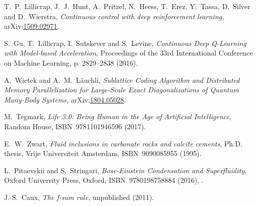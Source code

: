 \documentclass[11pt, a4paper]{report} %
\begin{document}
\begin{thebibliography}{99}
T.~P.~Lillicrap, J.~J.~Hunt, A.~Pritzel, N.~Heess, T.~Erez, Y.~Tassa, D.~Silver and D.~Wierstra, \textit{Continuous control with deep reinforcement learning}, arXiv:\href{https://arxiv.org/abs/1509.02971}{1509.02971}.




S.~Gu, T.~Lillicrap, I.~Sutskever and S.~Levine, \textit{Continuous Deep Q-Learning with Model-based Acceleration}, Proceedings of the 33rd International Conference on Machine Learning, p. 2829--2838 (2016). 



A.~Wietek and A.~M.~Läuchli, \textit{Sublattice Coding Algorithm and Distributed Memory Parallelization for Large-Scale Exact Diagonalizations of Quantum Many-Body Systems}, arXiv:\href{https://arxiv.org/abs/1804.05028}{1804.05028}.




M.~Tegmark, \emph{Life 3.0: Being Human in the Age of Artificial Intelligence}, Random House, ISBN~9781101946596 (2017).



E.~W.~Zwart, \emph{Fluid inclusions in carbonate rocks and calcite cements}, Ph.D. thesis, Vrije Universiteit Amsterdam, ISBN~9090085955 (1995).






L.~Pitaevskii and S.~Stringari, \textit{Bose-Einstein Condensation and Superfluidity}, Oxford University Press, Oxford, ISBN~9780198758884 (2016), .




J.-S.~Caux, \emph{The f-sum rule}, unpublished (2011).





\end{thebibliography}

\newpage
\thispagestyle{empty}
\ 
\end{document}
